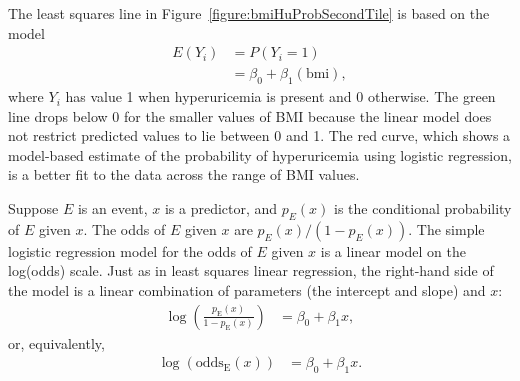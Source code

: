 The least squares line in Figure~\ref{figure:bmiHuProbSecondTile} is based on the model
\begin{align*}
  E(Y_i) &= P(Y_i = 1) \\
         &= \beta_0 + \beta_1 (\text{bmi}),
\end{align*}
where $Y_i$ has value 1 when hyperuricemia is present and 0 otherwise.  The green line drops below 0 for the smaller values of BMI because the linear model does not restrict predicted values to lie between 0 and 1.  The red curve, which shows a model-based estimate of the probability of hyperuricemia using logistic regression, is a better fit to the data across the range of BMI values. 

Suppose $E$ is an event, $x$ is a predictor, and $p_{E}(x)$ is the conditional probability of $E$ given $x$. The odds of $E$ given $x$ are $p_{E}(x)/(1 - p_{E}(x))$. The simple logistic regression model for the odds of $E$ given $x$ is a linear model on the log(odds) scale. Just as in least squares linear regression, the right-hand side of the model is a linear combination of parameters (the intercept and slope) and $x$: 
\begin{align}
   \log\left(\frac{p_{\text{E}}(x)}
  {1 - p_\text{E}(x)}\right) &= \beta_0 + \beta_1 x,
  \label{eqn:logOddsLogisticRegression}
\end{align}
or, equivalently,
\begin{align}
 \log(\text{odds}_\text{E}(x)) &= \beta_0 + \beta_1 x.
   \label{eqn:logOddsLogisticRegressionEquiv}
\end{align}

